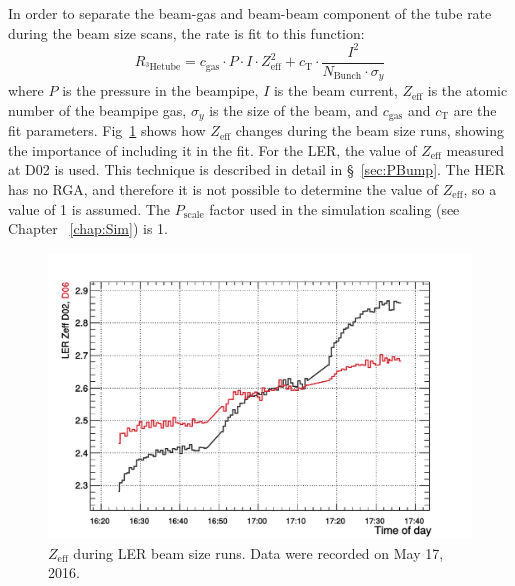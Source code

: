 	In order to separate the beam-gas and beam-beam component of the \he tube rate during the beam size scans, the rate is fit to this function:
\begin{equation}
	{R_{^{3}\mathrm{He tube}} = c_{\mathrm{gas}}\cdot P\cdot I\cdot Z_{\mathrm{eff}}^{2}+c_{\mathrm{T}}\cdot \frac{I^{2}}{N_{\mathrm{Bunch}}\cdot\sigma_{y}}}
	\label{eqn:TousFit}
\end{equation}
where $P$ is the pressure in the beampipe, $I$ is the beam current, $Z_{\mathrm{eff}}$ is the atomic number of the beampipe gas, $\sigma_{y}$ is the size of the beam, and $c_{\mathrm{gas}}$ and $c_{\mathrm{T}}$ are the fit parameters. Fig~\ref{fig:tousZef} shows how $Z_{\mathrm{eff}}$ changes during the beam size runs, showing the importance of including it in the fit. For the LER, the value of $Z_{\mathrm{eff}}$ measured at D02 is used. This technique is described in detail in \S~\ref{sec:PBump}. The HER has no RGA, and therefore it is not possible to determine the value of $Z_{\mathrm{eff}}$, so a value of 1 is assumed. The $P_{\mathrm{scale}}$ factor used in the simulation scaling (see Chapter ~\ref{chap:Sim}) is 1.


\begin{figure}
	\centerfloat
		\includegraphics[width=\textwidth]{images/Zeff}
	\caption[$Z_{\mathrm{eff}}$ during LER beam size runs]{$Z_{\mathrm{eff}}$ during LER beam size runs. Data were recorded on May 17, 2016.}	
	\label{fig:tousZef}
\end{figure}

